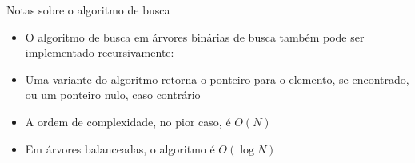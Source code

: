 \begin{frame}[fragile]{Notas sobre o algoritmo de busca}

	\begin{itemize}
		\item O algoritmo de busca em árvores binárias de busca também pode ser 
		implementado {recursivamente}:


		\item Uma {variante} do algoritmo retorna o ponteiro para  o elemento, se encontrado, 
            ou um ponteiro {nulo}, caso contrário

		\item A ordem de complexidade, no pior caso, é $O(N)$

		\item Em árvores balanceadas, o algoritmo é $O(\log N)$
	\end{itemize}

\end{frame}  

